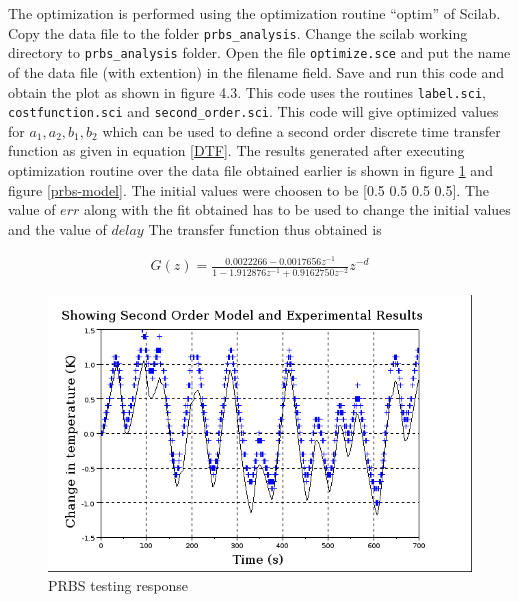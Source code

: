 The optimization is performed using the optimization routine “optim” of Scilab. Copy the  data file to the folder {\tt prbs\_analysis}. Change the scilab working directory to {\tt prbs\_analysis} folder. Open the file {\tt optimize.sce} and put the name of the data file (with extention) in the filename field. Save and run this code and obtain the plot as shown in figure 4.3. This code uses the routines {\tt label.sci}, {\tt costfunction.sci} and {\tt second\_order.sci}. This code will give optimized values for $a_1, a_2, b_1, b_2$ which can be used to define a second order discrete time transfer function as given in equation \ref{DTF}. The results generated after executing optimization routine over the data file obtained earlier is shown in figure \ref{prbs-fit} and figure \ref{prbs-model}. The initial values were choosen to be [0.5 0.5 0.5 0.5]. The value of $err$ along with the fit obtained has to be used to change the initial values and the value of $delay$ The transfer function thus obtained is 

\begin{align}\label{model}
G(z)=\frac{0.0022266 - 0.0017656 z^{-1}}{1-1.912876z^{-1}+0.9162750z^{-2}}z^{-d}
\end{align}


\begin{figure}
\centering
\includegraphics[width=0.7\linewidth]{prbs/prbs-fit.png}
\caption{PRBS testing response}
\label{prbs-fit}
\end{figure}


